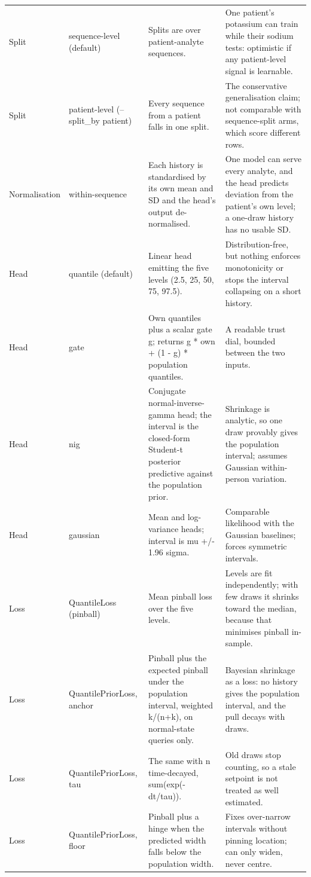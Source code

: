 \begin{table}[ht]
\begin{tabular}{l p{2.4cm} p{6.4cm} p{6.4cm}}
\midrule
Split & sequence-level (default) & Splits are over patient-analyte sequences. & One patient's potassium can train while their sodium tests: optimistic if any patient-level signal is learnable. \\
Split & patient-level (--split\_by patient) & Every sequence from a patient falls in one split. & The conservative generalisation claim; not comparable with sequence-split arms, which score different rows. \\
\midrule
Normalisation & within-sequence & Each history is standardised by its own mean and SD and the head's output de-normalised. & One model can serve every analyte, and the head predicts deviation from the patient's own level; a one-draw history has no usable SD. \\
\midrule
Head & quantile (default) & Linear head emitting the five levels (2.5, 25, 50, 75, 97.5). & Distribution-free, but nothing enforces monotonicity or stops the interval collapsing on a short history. \\
Head & gate & Own quantiles plus a scalar gate g; returns g * own + (1 - g) * population quantiles. & A readable trust dial, bounded between the two inputs. \\
Head & nig & Conjugate normal-inverse-gamma head; the interval is the closed-form Student-t posterior predictive against the population prior. & Shrinkage is analytic, so one draw provably gives the population interval; assumes Gaussian within-person variation. \\
Head & gaussian & Mean and log-variance heads; interval is mu +/- 1.96 sigma. & Comparable likelihood with the Gaussian baselines; forces symmetric intervals. \\
\midrule
Loss & QuantileLoss (pinball) & Mean pinball loss over the five levels. & Levels are fit independently; with few draws it shrinks toward the median, because that minimises pinball in-sample. \\
Loss & QuantilePriorLoss, anchor & Pinball plus the expected pinball under the population interval, weighted k/(n+k), on normal-state queries only. & Bayesian shrinkage as a loss: no history gives the population interval, and the pull decays with draws. \\
Loss & QuantilePriorLoss, tau & The same with n time-decayed, sum(exp(-dt/tau)). & Old draws stop counting, so a stale setpoint is not treated as well estimated. \\
Loss & QuantilePriorLoss, floor & Pinball plus a hinge when the predicted width falls below the population width. & Fixes over-narrow intervals without pinning location; can only widen, never centre. \\

\end{tabular}
\end{table}
